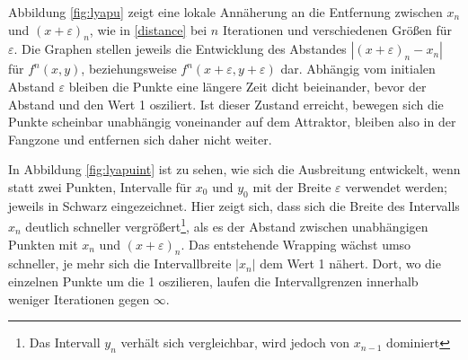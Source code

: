  
 Abbildung \ref{fig:lyapu} zeigt eine lokale Annäherung an die Entfernung zwischen $x_n$ und $(x+\varepsilon)_n$, wie in \ref{distance} bei $n$ Iterationen und verschiedenen Größen für $\varepsilon$. Die Graphen stellen jeweils die Entwicklung des Abstandes $|(x+\varepsilon)_n - x_n|$ für $f^n(x,y)$, beziehungsweise $f^n(x+\varepsilon,y+\varepsilon)$ dar. Abhängig vom initialen Abstand $\varepsilon$ bleiben die Punkte eine längere Zeit dicht beieinander, bevor der Abstand und den Wert 1 osziliert. Ist dieser Zustand erreicht, bewegen sich die Punkte scheinbar unabhängig voneinander auf dem Attraktor, bleiben also in der Fangzone und entfernen sich daher nicht weiter. 

 
 
 In Abbildung \ref{fig:lyapuint} ist zu sehen, wie sich die Ausbreitung entwickelt, wenn statt zwei Punkten, Intervalle für $x_0$ und $y_0$ mit der Breite $\varepsilon$ verwendet werden; jeweils in Schwarz eingezeichnet. Hier zeigt sich, dass sich die Breite des Intervalls $x_n$ deutlich schneller vergrößert\footnote{Das Intervall $y_n$ verhält sich vergleichbar, wird jedoch von $x_{n-1}$ dominiert}, als es der Abstand zwischen unabhängigen Punkten mit $x_n$ und $(x+\varepsilon)_n$. Das entstehende Wrapping wächst umso schneller, je mehr sich die Intervallbreite $|x_n|$ dem Wert 1 nähert. Dort, wo die einzelnen Punkte um die 1 oszilieren, laufen die Intervallgrenzen innerhalb weniger Iterationen gegen $\infty$.
 

